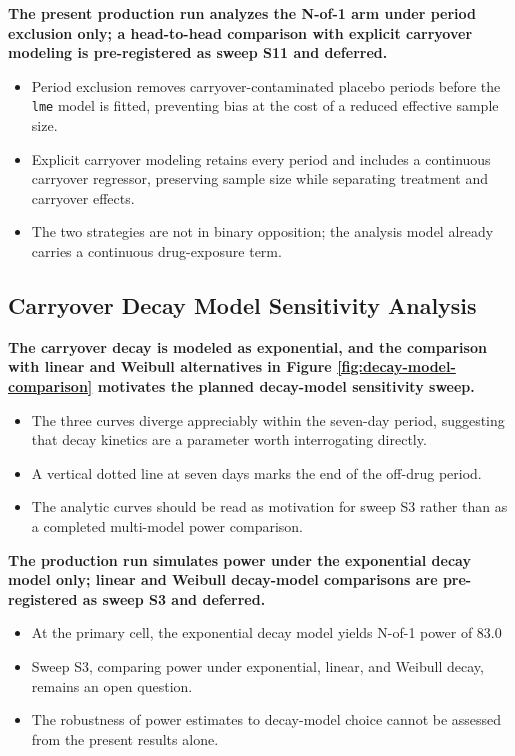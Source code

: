 \documentclass[
  11pt,
]{article}
\begin{document}
\textbf{The present production run analyzes the N-of-1 arm under period exclusion only; a head-to-head comparison with explicit carryover modeling is pre-registered as sweep S11 and deferred.}

\begin{itemize}\setlength{\itemsep}{2pt}\setlength{\parskip}{0pt}
\item Period exclusion removes carryover-contaminated placebo periods before the \texttt{lme} model is fitted, preventing bias at the cost of a reduced effective sample size.
\item Explicit carryover modeling retains every period and includes a continuous carryover regressor, preserving sample size while separating treatment and carryover effects.
\item The two strategies are not in binary opposition; the analysis model already carries a continuous drug-exposure term.
\end{itemize}

\subsection{Carryover Decay Model Sensitivity Analysis}\label{carryover-decay-model-sensitivity-analysis}

\textbf{The carryover decay is modeled as exponential, and the comparison with linear and Weibull alternatives in Figure \ref{fig:decay-model-comparison} motivates the planned decay-model sensitivity sweep.}

\begin{itemize}\setlength{\itemsep}{2pt}\setlength{\parskip}{0pt}
\item The three curves diverge appreciably within the seven-day period, suggesting that decay kinetics are a parameter worth interrogating directly.
\item A vertical dotted line at seven days marks the end of the off-drug period.
\item The analytic curves should be read as motivation for sweep S3 rather than as a completed multi-model power comparison.
\end{itemize}

\textbf{The production run simulates power under the exponential decay model only; linear and Weibull decay-model comparisons are pre-registered as sweep S3 and deferred.}

\begin{itemize}\setlength{\itemsep}{2pt}\setlength{\parskip}{0pt}
\item At the primary cell, the exponential decay model yields N-of-1 power of 83.0%
\item Sweep S3, comparing power under exponential, linear, and Weibull decay, remains an open question.
\item The robustness of power estimates to decay-model choice cannot be assessed from the present results alone.
\end{itemize}
\end{document}
